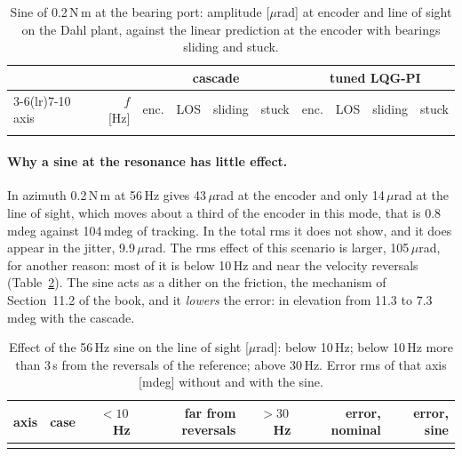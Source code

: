 \documentclass[10pt,a4paper]{article}
\numberwithin{equation}{section}
\begin{document}
\begin{table}[H]\centering\footnotesize\setlength{\tabcolsep}{3pt}
\caption{Sine of 0.2\,N\,m at the bearing port: amplitude [$\mu$rad] at encoder and line of sight on the Dahl plant, against the linear prediction at the encoder with bearings sliding and stuck.}\label{tab:sines}
\begin{tabular}{lrrrrrrrrr}\toprule
& & \multicolumn{4}{c}{cascade} & \multicolumn{4}{c}{tuned LQG-PI} \\
\cmidrule(lr){3-6}\cmidrule(lr){7-10}
axis & $f$ [Hz] & enc. & LOS & sliding & stuck & enc. & LOS & sliding & stuck \\ \midrule
\\ \bottomrule
\end{tabular}\end{table}

\paragraph{Why a sine at the resonance has little effect.} In azimuth 0.2\,N\,m at 56\,Hz gives 43\,$\mu$rad at the encoder and only 14\,$\mu$rad at the line of sight, which moves about a third of the encoder in this mode, that is 0.8\,mdeg against 104\,mdeg of tracking. In the total rms it does not show, and it does appear in the jitter, 9.9\,$\mu$rad. The rms effect of this scenario is larger, 105\,$\mu$rad, for another reason: most of it is below 10\,Hz and near the velocity reversals (Table~\ref{tab:dither}). The sine acts as a dither on the friction, the mechanism of Section~11.2 of the book, and it \emph{lowers} the error: in elevation from 11.3 to 7.3\,mdeg with the cascade.

\begin{table}[H]\centering\footnotesize
\caption{Effect of the 56\,Hz sine on the line of sight [$\mu$rad]: below 10\,Hz; below 10\,Hz more than 3\,s from the reversals of the reference; above 30\,Hz. Error rms of that axis [mdeg] without and with the sine.}\label{tab:dither}
\begin{tabular}{llrrrrr}\toprule
axis & case & $<10$\,Hz & far from reversals & $>30$\,Hz & error, nominal & error, sine \\ \midrule
\\ \bottomrule
\end{tabular}\end{table}
\end{document}
